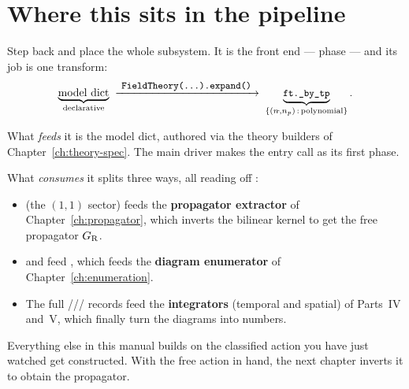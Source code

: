 \section{Where this sits in the pipeline}

Step back and place the whole subsystem. It is the front end --- phase \code{[1/7]}
--- and its job is one transform:
\[
  \underbrace{\text{model dict}}_{\text{declarative}}
  \;\xrightarrow{\ \text{\texttt{\small FieldTheory(...).expand()}}\ }\;
  \underbrace{\texttt{\small ft.\_by\_tp}}_{\{(n_{\tilde{}},n_p)\,:\,\text{polynomial}\}}.
\]

What \emph{feeds} it is the model dict, authored via the theory builders of
Chapter~\ref{ch:theory-spec}. The main driver  makes the
entry call  as its first phase.

What \emph{consumes} it splits three ways, all reading off :

\begin{itemize}
  \item {} (the $(1,1)$ sector) feeds the \textbf{propagator
        extractor} of Chapter~\ref{ch:propagator}, which inverts the bilinear kernel
        to get the free propagator $G_{\mathrm R}$.
  \item {} and  feed
        , which feeds the \textbf{diagram enumerator} of
        Chapter~\ref{ch:enumeration}.
  \item The full ///
        records feed the \textbf{integrators} (temporal and spatial) of Parts~IV
        and~V, which finally turn the diagrams into numbers.
\end{itemize}

Everything else in this manual builds on the classified action you have just watched
get constructed. With the free action in hand, the next chapter inverts it to obtain
the propagator.
